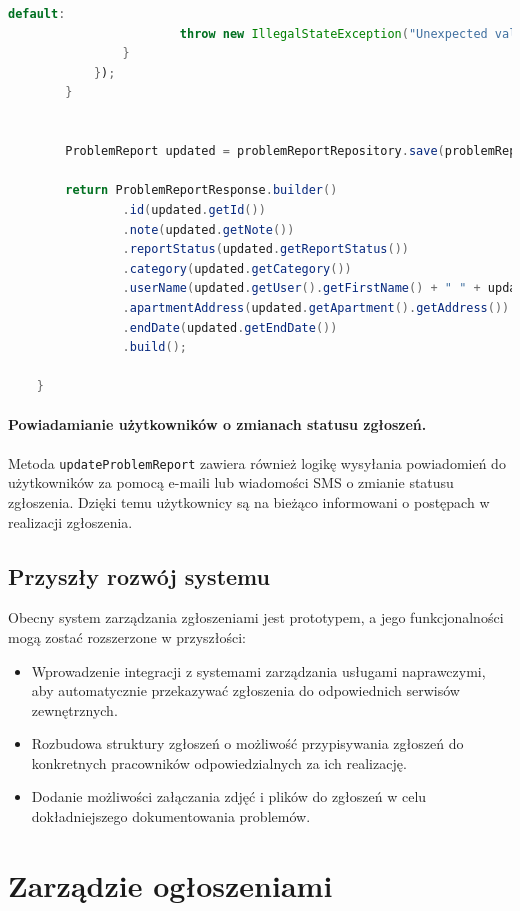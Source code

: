 \begin{lstlisting}[language=Java, caption=Aktualizacja zgłoszenia problemu.]
                    default:
                        throw new IllegalStateException("Unexpected value: " + notificationType.getType());
                }
            });
        }


        ProblemReport updated = problemReportRepository.save(problemReportToUpdate);

        return ProblemReportResponse.builder()
                .id(updated.getId())
                .note(updated.getNote())
                .reportStatus(updated.getReportStatus())
                .category(updated.getCategory())
                .userName(updated.getUser().getFirstName() + " " + updated.getUser().getLastName())
                .apartmentAddress(updated.getApartment().getAddress())
                .endDate(updated.getEndDate())
                .build();

    }
\end{lstlisting}

\paragraph{Powiadamianie użytkowników o zmianach statusu zgłoszeń.}

Metoda \texttt{updateProblemReport} zawiera również logikę wysyłania powiadomień do użytkowników za pomocą e-maili lub wiadomości SMS o zmianie statusu zgłoszenia. Dzięki temu użytkownicy są na bieżąco informowani o postępach w realizacji zgłoszenia.

\subsection{Przyszły rozwój systemu}
Obecny system zarządzania zgłoszeniami jest prototypem, a jego funkcjonalności mogą zostać rozszerzone w przyszłości:
\begin{itemize}
    \item Wprowadzenie integracji z systemami zarządzania usługami naprawczymi, aby automatycznie przekazywać zgłoszenia do odpowiednich serwisów zewnętrznych.
    \item Rozbudowa struktury zgłoszeń o możliwość przypisywania zgłoszeń do konkretnych pracowników odpowiedzialnych za ich realizację.
    \item Dodanie możliwości załączania zdjęć i plików do zgłoszeń w celu dokładniejszego dokumentowania problemów.
\end{itemize}


\section{Zarządzie ogłoszeniami}

